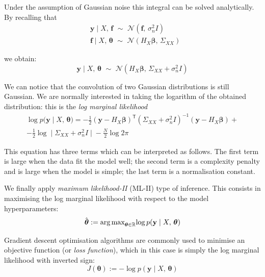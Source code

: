 \noindent
Under the assumption of Gaussian noise this integral can be solved analytically. By recalling that
\begin{align}
    &\mathbf{y}\;\vert\; X,\,\mathbf{f}\,\,\sim\,\,\mathcal{N}(\mathbf{f},\,\sigma_n^2I) \\
    &\mathbf{f}\;\vert\; X,\,\boldsymbol{\theta} \,\,\sim\,\,\mathcal{N}(H_{X}\boldsymbol{\beta},\,\Sigma_{XX})
\end{align}

\noindent
we obtain:
\begin{equation}
    \mathbf{y}\;\vert\; X,\,\boldsymbol{\theta}\,\,\sim\,\,\mathcal{N}(H_{X}\boldsymbol{\beta},\,\Sigma_{XX}+\sigma_n^2I)
\end{equation}

\noindent
We can notice that the convolution of two Gaussian distributions is still Gaussian. We are normally interested in taking the logarithm of the obtained distribution: this is the \textit{log marginal likelihood}
\begin{equation}
\begin{split}
    \log{p(\mathbf{y}\;\vert\; X,\,\boldsymbol{\theta}}) = -\frac{1}{2}(\mathbf{y}-H_X\boldsymbol{\beta})^\mathsf{T}(\Sigma_{XX}+\sigma_n^2I)^{-1}(\mathbf{y}-H_X\boldsymbol{\beta}) + \\ -\frac{1}{2}\log{\;\vert\; \Sigma_{XX}+\sigma_n^2I\;\vert\; } - \frac{N}{2}\log{2\pi}
\end{split}
\end{equation}

\noindent
This equation has three terms which can be interpreted as follows. The first term is large when the data fit the model well; the second term is a complexity penalty and is large when the model is simple; the last term is a normalisation constant.

\vspace{0.2cm}
We finally apply \textit{maximum likelihood-II} (ML-II) type of inference. This consists in maximising the log marginal likelihood with respect to the model hyperparameters:
%
\begin{equation}
    \hat{\boldsymbol{\theta}} := \textrm{arg\,max}_{\boldsymbol{\theta}\in\mathbb{R}}{\log{p(\mathbf{y}\;\vert\; X,\,\boldsymbol{\theta})}}
\end{equation}

\noindent
Gradient descent optimisation algorithms are commonly used  to minimise an objective function (or \textit{loss function}), which in this case is simply the log marginal likelihood with inverted sign:
%
\begin{equation}
    J(\boldsymbol{\theta}) := -\log{p(\mathbf{y}\;\vert\; X,\,\boldsymbol{\theta})}
\end{equation}

